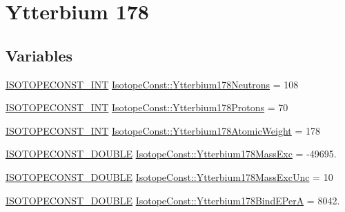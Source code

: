 \hypertarget{group___isotope_const-_ytterbium-_yb178}{}\section{Ytterbium 178}
\label{group___isotope_const-_ytterbium-_yb178}
\subsection*{Variables}
\begin{DoxyCompactItemize}
\item 
\mbox{\hyperlink{group___isotope_const-_macros_ga5f18360b3e99483a35c32d789e62621c}{I\+S\+O\+T\+O\+P\+E\+C\+O\+N\+S\+T\+\_\+\+I\+NT}} \mbox{\hyperlink{group___isotope_const-_ytterbium-_yb178_ga5a27f5fe1d9ec55009800f2097170db7}{Isotope\+Const\+::\+Ytterbium178\+Neutrons}} = 108
\item 
\mbox{\hyperlink{group___isotope_const-_macros_ga5f18360b3e99483a35c32d789e62621c}{I\+S\+O\+T\+O\+P\+E\+C\+O\+N\+S\+T\+\_\+\+I\+NT}} \mbox{\hyperlink{group___isotope_const-_ytterbium-_yb178_ga01108ea5f2040fca9da221d7990d43fd}{Isotope\+Const\+::\+Ytterbium178\+Protons}} = 70
\item 
\mbox{\hyperlink{group___isotope_const-_macros_ga5f18360b3e99483a35c32d789e62621c}{I\+S\+O\+T\+O\+P\+E\+C\+O\+N\+S\+T\+\_\+\+I\+NT}} \mbox{\hyperlink{group___isotope_const-_ytterbium-_yb178_gac5dc6de9cd400d5db33a45ad57d94533}{Isotope\+Const\+::\+Ytterbium178\+Atomic\+Weight}} = 178
\item 
\mbox{\hyperlink{group___isotope_const-_macros_ga8f45a7272ce02c0b4c65c44636ed719a}{I\+S\+O\+T\+O\+P\+E\+C\+O\+N\+S\+T\+\_\+\+D\+O\+U\+B\+LE}} \mbox{\hyperlink{group___isotope_const-_ytterbium-_yb178_ga70bf7a4345fe17d8db1437e68f3b926a}{Isotope\+Const\+::\+Ytterbium178\+Mass\+Exc}} = -\/49695.
\item 
\mbox{\hyperlink{group___isotope_const-_macros_ga8f45a7272ce02c0b4c65c44636ed719a}{I\+S\+O\+T\+O\+P\+E\+C\+O\+N\+S\+T\+\_\+\+D\+O\+U\+B\+LE}} \mbox{\hyperlink{group___isotope_const-_ytterbium-_yb178_ga65285028de54814b0d09c861b18da009}{Isotope\+Const\+::\+Ytterbium178\+Mass\+Exc\+Unc}} = 10
\item 
\mbox{\hyperlink{group___isotope_const-_macros_ga8f45a7272ce02c0b4c65c44636ed719a}{I\+S\+O\+T\+O\+P\+E\+C\+O\+N\+S\+T\+\_\+\+D\+O\+U\+B\+LE}} \mbox{\hyperlink{group___isotope_const-_ytterbium-_yb178_gac83bc10974d7f052734708bc79274607}{Isotope\+Const\+::\+Ytterbium178\+Bind\+E\+PerA}} = 8042.
\item 

\end{DoxyCompactItemize}

